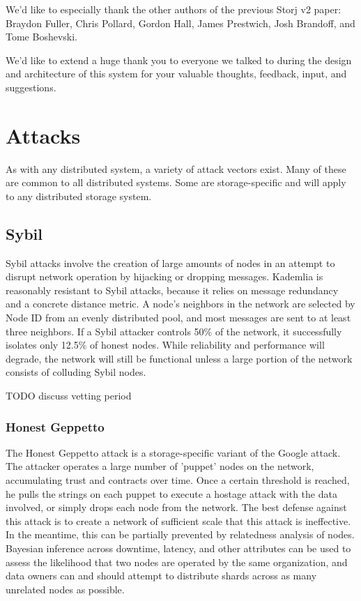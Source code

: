 \documentclass[a4paper,10pt]{article} \usepackage[utf8]{inputenc}
\newcommand{\todo}[1]{{\color{red} TODO #1 }}
\begin{document}
We'd like to especially thank the other authors of the previous Storj v2 paper:
Braydon Fuller,
Chris Pollard,
Gordon Hall,
James Prestwich,
Josh Brandoff,
and Tome Boshevski.

We'd like to extend a huge thank you to everyone we talked to during the
design and architecture of this system for your valuable thoughts, feedback,
input, and suggestions.

\newpage \appendix

\section{Attacks}

As with any distributed system, a variety of attack vectors exist. Many of these
are common to all distributed systems. Some are storage-specific and will apply
to any distributed storage system.

\subsection{Sybil}

Sybil attacks involve the creation of large amounts of nodes in an attempt to
disrupt network operation by hijacking or dropping messages. Kademlia
is reasonably
resistant to Sybil attacks, because
it relies on message redundancy and a concrete distance metric.
A node's neighbors in the network are selected by
Node ID from an evenly distributed pool, and most messages are sent to at least
three neighbors. If a Sybil attacker controls 50\% of the network, it
successfully isolates only 12.5\% of honest nodes. While reliability and
performance will degrade, the network will still be functional unless a large
portion of the network consists of colluding Sybil nodes.

\todo{discuss vetting period}

\subsubsection{Honest Geppetto}

The Honest Geppetto attack is a storage-specific variant of the Google attack.
The attacker operates a large number of 'puppet' nodes on the network,
accumulating trust and contracts over time. Once a certain threshold is reached,
he pulls the strings on each puppet to execute a hostage attack with the data
involved, or simply drops each node from the network. The best defense
against this attack is to create a network of sufficient scale that this attack
is ineffective. In the meantime, this can be partially prevented by relatedness
analysis of nodes. Bayesian inference across downtime, latency, and other
attributes can be used to assess the likelihood that two nodes are operated by
the same organization, and data owners can and should attempt to distribute
shards across as many unrelated nodes as possible.
\end{document}
